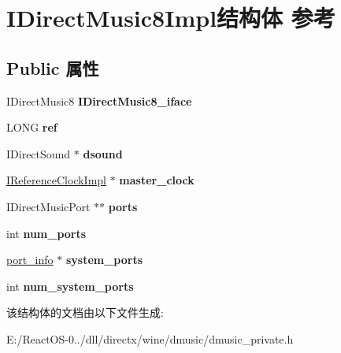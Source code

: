 \hypertarget{struct_i_direct_music8_impl}{}\section{I\+Direct\+Music8\+Impl结构体 参考}
\label{struct_i_direct_music8_impl}
\subsection*{Public 属性}
\begin{DoxyCompactItemize}
\item 
\mbox{\label{struct_i_direct_music8_impl_aaa67782b4a9c3793188488def49bf92d}} 
I\+Direct\+Music8 {\bfseries I\+Direct\+Music8\+\_\+iface}
\item 
\mbox{\label{struct_i_direct_music8_impl_ac214c2f137790e90f7cbc9ad05ae4935}} 
L\+O\+NG {\bfseries ref}
\item 
\mbox{\label{struct_i_direct_music8_impl_a49c9e85af0e366fa582c676df9d552f5}} 
I\+Direct\+Sound $\ast$ {\bfseries dsound}
\item 
\mbox{\label{struct_i_direct_music8_impl_a6d460613b192294e12f87940e6211c09}} 
\hyperlink{struct_i_reference_clock_impl}{I\+Reference\+Clock\+Impl} $\ast$ {\bfseries master\+\_\+clock}
\item 
\mbox{\label{struct_i_direct_music8_impl_a31440283b82879f1323a30f2c495fc73}} 
I\+Direct\+Music\+Port $\ast$$\ast$ {\bfseries ports}
\item 
\mbox{\label{struct_i_direct_music8_impl_a9ac27f3277b18e95b56586ae074487f2}} 
int {\bfseries num\+\_\+ports}
\item 
\mbox{\label{struct_i_direct_music8_impl_abdd504a000301a4cb9faa7e7e8c7e96f}} 
\hyperlink{structport__info}{port\+\_\+info} $\ast$ {\bfseries system\+\_\+ports}
\item 
\mbox{\label{struct_i_direct_music8_impl_ae630e07d7a916c1dd8383d481033e960}} 
int {\bfseries num\+\_\+system\+\_\+ports}
\end{DoxyCompactItemize}


该结构体的文档由以下文件生成\+:\begin{DoxyCompactItemize}
\item 
E\+:/\+React\+O\+S-\/0../dll/directx/wine/dmusic/dmusic\+\_\+private.\+h\end{DoxyCompactItemize}
